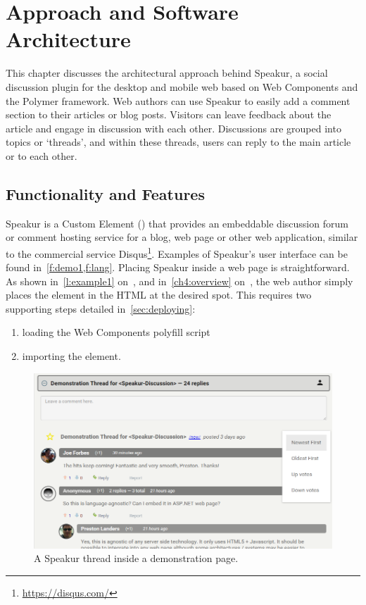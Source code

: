 \chapter{Approach and Software Architecture}
%
\label{ch:approach}

This chapter discusses the architectural approach behind Speakur, 
a social discussion plugin for the desktop and mobile web based on Web Components and the Polymer framework.
Web authors can use Speakur to easily add a comment section to their articles or blog posts.
Visitors can leave feedback about the article and engage in discussion with each other.
Discussions are grouped into topics or `threads', and within these threads, users can reply to the main article or to each other.

\section{Functionality and Features}
Speakur 
is a Custom Element 
() 
that provides an embeddable discussion forum or comment hosting service for a blog, web page or other web application, similar to the commercial service Disqus\footnote{\url{https://disqus.com/}}.
Examples of Speakur's user interface can be found in~\cref{f:demo1,f:lang}.
Placing Speakur inside a web page is straightforward.
As shown in~\cref{l:example1} on~,
and in~\cref{ch4:overview} on~,
the web author simply places the 
 element in the HTML at the desired spot.
This requires two supporting steps detailed in~\cref{sec:deploying}:
\begin{enumerate}
\item loading the Web Components polyfill script
\item importing the  element.
\end{enumerate}

\begin{figure}[htb]
\centering
 \includegraphics[width=\textwidth]{images/screenshot_20150312_1630_v2.png}
\caption{A Speakur thread inside a demonstration page.}
\label{f:demo1}
\end{figure}

